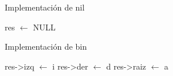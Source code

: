 \begin{Algoritmos}
\begin{algorithm}
\caption{Implementaci\'on de nil}
\begin{algorithmic}[0]
	\State res $\gets$ NULL
\EndFunction
\end{algorithmic}
\end{algorithm}

\begin{algorithm}
\caption{Implementaci\'on de bin}
\begin{algorithmic}[0]
	\State res->izq $\gets$ i
	\State res->der $\gets$ d
	\State res->raiz $\gets$ a
\EndFunction
\end{algorithmic}
\end{algorithm}

\end{Algoritmos}